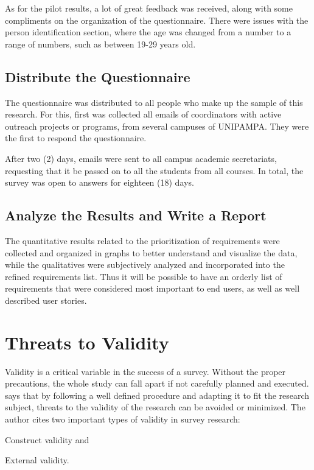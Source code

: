 As for the pilot results, a lot of great feedback was received, along with some compliments on the organization of the questionnaire. There were issues with the person identification section, where the age was changed from a number to a range of numbers, such as between 19-29 years old.

\subsection{Distribute the Questionnaire}\label{sec:survey-distribute}

The questionnaire was distributed to all people who make up the sample of this research. For this, first was collected all emails of coordinators with active outreach projects or programs, from several campuses of \ac{UNIPAMPA}. They were the first to respond the questionnaire.

After two (2) days, emails were sent to all campus academic secretariats, requesting that it be passed on to all the students from all courses. In total, the survey was open to answers for eighteen (18) days.

\subsection{Analyze the Results and Write a Report}\label{sec:survey-analyse}

The quantitative results related to the prioritization of requirements were collected and organized in graphs to better understand and visualize the data, while the qualitatives were subjectively analyzed and incorporated into the refined requirements list. Thus it will be possible to have an orderly list of requirements that were considered most important to end users, as well as well described user stories.

\section{Threats to Validity}\label{sec:survey-validity}

Validity is a critical variable in the success of a survey. Without the proper precautions, the whole study can fall apart if not carefully planned and executed.  says that by following a well defined procedure and adapting it to fit the research subject, threats to the validity of the research can be avoided or minimized. The author cites two important types of validity in survey research:
\begin{inparaenum}[(1)]
  \item Construct validity and
  \item External validity.
\end{inparaenum}

